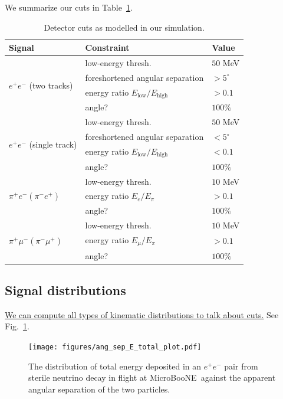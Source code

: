 \documentclass[11pt, a4paper]{article}
\newcommand{\reffig}[1]{Fig.~\ref{#1}}
\newcommand{\reftab}[1]{Table~\ref{#1}}
\def\muboone{MicroBooNE}
\newcommand{\newtext}[2]{\textcolor{#1}{\ul{#2}}}
\begin{document}
We summarize our cuts in \reftab{tab:cuts}.
%
\begin{table}[t]
\centering
\begin{tabular}{ l | l | l}
Signal & Constraint & Value \\
\hline\hline
 \multirow{4}{*}{$e^+ e^-$ (two tracks)} & low-energy thresh. & $50$ MeV\\
 \cline{2-3}
 & foreshortened angular separation & $>5^\circ$ \\
 \cline{2-3}
 & energy ratio $E_\text{low}/E_\text{high}$ & $>0.1$\\
 \cline{2-3}
 & angle? & $100\%$\\
\cline{1-3}
 \multirow{4}{*}{$e^+ e^-$ (single track)} & low-energy thresh. & $50$ MeV\\
 \cline{2-3}
 & foreshortened angular separation & $<5^\circ$ \\
 \cline{2-3}
 & energy ratio $E_\text{low}/E_\text{high}$ & $<0.1$\\
 \cline{2-3}
 & angle? & $100\%$\\
\cline{1-3}
 \multirow{3}{*}{$\pi^+e^-(\pi^-e^+)$} & low-energy thresh. & $10$ MeV\\
 \cline{2-3}
 & energy ratio $E_e/E_\pi$ & $>0.1$\\
 \cline{2-3}
 & angle? & $100\%$\\
\cline{1-3}
 \multirow{3}{*}{$\pi^+\mu^-(\pi^-\mu^+)$} & low-energy thresh. & $10$ MeV\\
\cline{2-3}
 & energy ratio $E_\mu/E_\pi$ & $>0.1$\\
\cline{2-3}
 & angle? & $100\%$\\
\end{tabular}
\caption{\label{tab:cuts}Detector cuts as modelled in our simulation.}
\end{table}
\newpage
\newpage

\subsection{Signal distributions}

\newtext{PB}{We can compute all types of kinematic distributions to talk about
cuts.} See \reffig{fig:ang_sep_E_total}.



\begin{figure}[t]
\center
\texttt{[image: figures/ang\_sep\_E\_total\_plot.pdf]}

\caption{\label{fig:ang_sep_E_total}The distribution of total energy deposited in an $e^+e^-$ pair from sterile neutrino decay in flight at \muboone\ against the apparent angular separation of the two particles.}

\end{figure}
\end{document}
